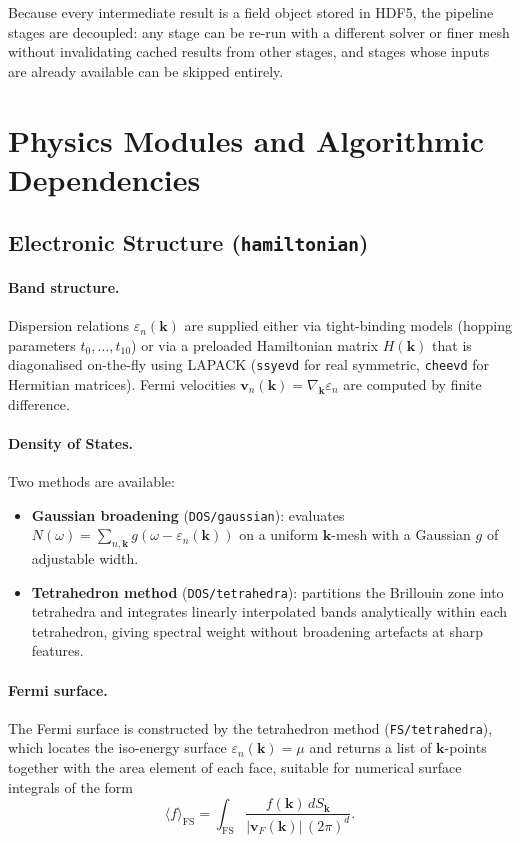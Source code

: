 Because every intermediate result is a field object stored in HDF5, the pipeline
stages are decoupled: any stage can be re-run with a different solver or finer mesh
without invalidating cached results from other stages, and stages whose inputs are
already available can be skipped entirely.

\section{Physics Modules and Algorithmic Dependencies}

\subsection{Electronic Structure (\texttt{hamiltonian})}

\paragraph{Band structure.}
Dispersion relations $\varepsilon_n(\mathbf{k})$ are supplied either via
tight-binding models (hopping parameters $t_0,\ldots,t_{10}$) or via a preloaded
Hamiltonian matrix $H(\mathbf{k})$ that is diagonalised on-the-fly using LAPACK
(\texttt{ssyevd} for real symmetric, \texttt{cheevd} for Hermitian matrices).
Fermi velocities $\mathbf{v}_n(\mathbf{k}) = \nabla_\mathbf{k}\varepsilon_n$ are
computed by finite difference.

\paragraph{Density of States.}
Two methods are available:

\begin{itemize}
    \item \textbf{Gaussian broadening} (\texttt{DOS/gaussian}): evaluates
        $N(\omega)=\sum_{n,\mathbf{k}} g(\omega - \varepsilon_n(\mathbf{k}))$ on a
        uniform $\mathbf{k}$-mesh with a Gaussian $g$ of adjustable width.
    \item \textbf{Tetrahedron method} (\texttt{DOS/tetrahedra}): partitions the
        Brillouin zone into tetrahedra and integrates linearly interpolated bands
        analytically within each tetrahedron, giving spectral weight without
        broadening artefacts at sharp features.
\end{itemize}

\paragraph{Fermi surface.}
The Fermi surface is constructed by the tetrahedron method (\texttt{FS/tetrahedra}),
which locates the iso-energy surface $\varepsilon_n(\mathbf{k})=\mu$ and returns
a list of $\mathbf{k}$-points together with the area element of each face, suitable
for numerical surface integrals of the form
\[
    \langle f \rangle_{\mathrm{FS}} = \int_{\mathrm{FS}}
    \frac{f(\mathbf{k})\,dS_\mathbf{k}}{|\mathbf{v}_F(\mathbf{k})|\,(2\pi)^d}.
\]


